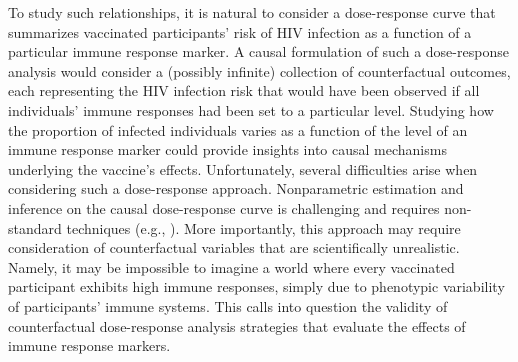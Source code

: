 To study such relationships, it is natural to consider a dose-response curve
that summarizes vaccinated participants' risk of HIV infection as a function of
a particular immune response marker. A causal formulation of such
a dose-response analysis would consider a (possibly infinite) collection of
counterfactual outcomes, each representing the HIV infection risk that would
have been observed if all individuals' immune responses had been set to
a particular level. Studying how the proportion of infected individuals varies
as a function of the level of an immune response marker could provide insights
into causal mechanisms underlying the vaccine's effects. Unfortunately, several
difficulties arise when considering such a dose-response approach. Nonparametric
estimation and inference on the causal dose-response curve is challenging and
requires non-standard techniques (e.g., \citet{kennedy2017nonparametric}). More
importantly, this approach may require consideration of counterfactual variables
that are scientifically unrealistic. Namely, it may be impossible to imagine
a world where every vaccinated participant exhibits high immune responses,
simply due to phenotypic variability of participants' immune systems. This calls
into question the validity of counterfactual dose-response analysis strategies
that evaluate the effects of immune response markers.

